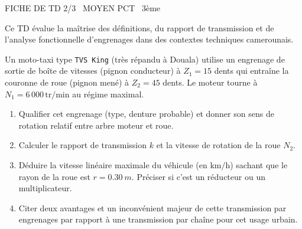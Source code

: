 \documentclass[11pt]{article}
\begin{document}
\begin{tcolorbox}[enhanced,colback=popink,colframe=popink,arc=10pt,boxrule=0pt,left=12pt,right=12pt,top=9pt,bottom=9pt]
{\color{white}\popxbold\small FICHE DE TD 2/3 \textbullet\ MOYEN \hfill PCT \textbullet\ 3ème\par}
\end{tcolorbox}
\vspace{4pt}
Ce TD évalue la maîtrise des définitions, du rapport de transmission et de l'analyse fonctionnelle d'engrenages dans des contextes techniques camerounais.

\begin{exercice}
Un moto-taxi type \texttt{TVS King} (très répandu à Douala) utilise un engrenage de sortie de boîte de vitesses (pignon conducteur) à $Z_1 = 15$ dents qui entraîne la couronne de roue (pignon mené) à $Z_2 = 45$ dents. Le moteur tourne à $N_1 = 6\,000\,\text{tr/min}$ au régime maximal.
\begin{enumerate}
    \item Qualifier cet engrenage (type, denture probable) et donner son sens de rotation relatif entre arbre moteur et roue.
    \item Calculer le rapport de transmission $k$ et la vitesse de rotation de la roue $N_2$.
    \item Déduire la vitesse linéaire maximale du véhicule (en $\text{km/h}$) sachant que le rayon de la roue est $r = \SI{0,30}{m}$. Préciser si c'est un réducteur ou un multiplicateur.
    \item Citer deux avantages et un inconvénient majeur de cette transmission par engrenages par rapport à une transmission par chaîne pour cet usage urbain.
\end{enumerate}
\end{exercice}
\end{document}
